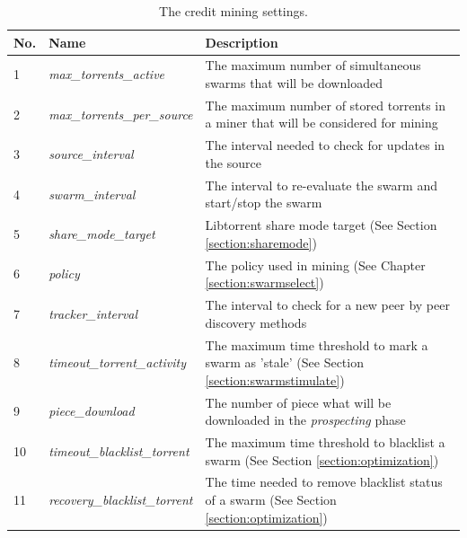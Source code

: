 \begin{table}[h]
	\centering
	\caption{The credit mining settings.}
	\label{tbl:cmsettings}
	\begin{adjustwidth}{-1.5cm}{}
	\begin{tabular}{|p{1cm}|p{4cm}|p{9cm}|}
		\hline
		\rowcolor[HTML]{EFEFEF} 
		No. & Name & Description \\ \hline
	1 & \textit{max\_torrents\_active} & The maximum number of simultaneous swarms that will be downloaded \\ \hline
	2 & \textit{max\_torrents\_per\_source} & The maximum number of stored torrents in a miner that will be considered for mining \\ \hline
	3 & \textit{source\_interval} & The interval needed to check for updates in the source \\ \hline
	4 & \textit{swarm\_interval} & The interval to re-evaluate the swarm and start/stop the swarm \\ \hline
	5 & \textit{share\_mode\_target} & Libtorrent share mode target (See Section \ref{section:sharemode}) \\ \hline
	6 & \textit{policy} & The policy used in mining (See Chapter \ref{section:swarmselect})  \\ \hline
	7 & \textit{tracker\_interval} & The interval to check for a new peer by peer discovery methods \\ \hline
	8 & \textit{timeout\_torrent\_activity} & The maximum time threshold to mark a swarm as 'stale' (See Section \ref{section:swarmstimulate}) \\ \hline
	9 & \textit{piece\_download} & The number of piece what will be downloaded in the \textit{prospecting} phase \\ \hline
	10 & \textit{timeout\_blacklist\_torrent} & The maximum time threshold to blacklist a swarm (See Section \ref{section:optimization}) \\ \hline
	11 & \textit{recovery\_blacklist\_torrent} & The time needed to remove blacklist status of a swarm (See Section \ref{section:optimization}) \\ \hline
	\end{tabular}
	\end{adjustwidth}
\end{table}



